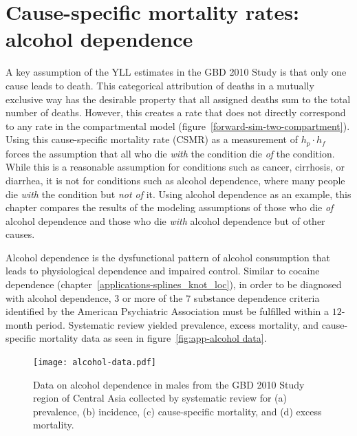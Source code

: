 \chapter{Cause-specific mortality rates: alcohol dependence}
\label{applications-csmr}

A key assumption of the YLL estimates in the GBD 2010 Study is that only
one cause leads to death.  This categorical attribution of deaths in
a mutually exclusive way has the desirable property that all assigned
deaths sum to the total number of deaths.  However, this
creates a rate that does not directly correspond to any rate in the
compartmental model (figure~\ref{forward-sim-two-compartment}).  Using this cause-specific mortality rate (CSMR)
as a measurement of $h_p \cdot h_f$ forces the assumption
that all who die \emph{with} the condition die \emph{of} the
condition.  While this is a reasonable assumption for conditions
such as cancer, cirrhosis, or diarrhea, it is not for conditions such as
alcohol dependence, where many people die \emph{with}
the condition but \emph{not of} it.  Using alcohol dependence as an
example, this chapter compares the results of
the modeling assumptions of those who die \emph{of} alcohol dependence
and those who die \emph{with} alcohol dependence but of other causes.

Alcohol dependence is the dysfunctional pattern of alcohol consumption
that leads to physiological dependence and impaired control.  Similar to
cocaine dependence (chapter~\ref{applications-splines_knot_loc}), in order to
be diagnosed with alcohol dependence, $3$ or more of the $7$
substance dependence criteria identified by the American Psychiatric
Association must be
fulfilled within a $12$-month period.
\cite{american_psychiatric_association_diagnostic_2000, hasin_prevalence_2007}
Systematic review yielded prevalence, excess mortality, and
cause-specific mortality data as seen in figure~\ref{fig:app-alcohol
  data}.

    \begin{figure}[h]
        \begin{center}
            \texttt{[image: alcohol-data.pdf]}
            \caption[Systematic review data for alcohol dependence.]{Data on alcohol
              dependence in males from the GBD 2010 Study region of
              Central Asia collected by systematic review for (a) prevalence, (b) incidence, (c)
              cause-specific mortality, and (d) excess mortality.}
            \label{fig:app-alcohol data}
        \end{center}
    \end{figure}


